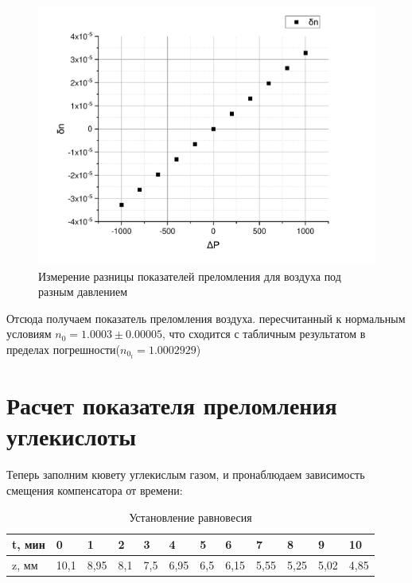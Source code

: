 \documentclass[12pt]{article}
\begin{document}
	\begin{figure}[h!]
		\begin{center}
			\includegraphics[width = \linewidth]{notp}
			\caption{Измерение разницы показателей преломления для воздуха под разным давлением}
		\end{center}
	\end{figure}
	
	Отсюда получаем показатель преломления воздуха. пересчитанный к нормальным условиям $ n_0 = 1.0003\pm 0.00005$, что сходится с табличным результатом в пределах погрешности($n_{0_{t}} = 1.0002929$)
	\newpage
\section{Расчет показателя преломления углекислоты}
	Теперь заполним кювету углекислым газом, и пронаблюдаем зависимость смещения компенсатора от времени:\\
	\begin{table}[h!]
	\caption{Установление равновесия}
\begin{tabular}{|l|l|l|l|l|l|l|l|l|l|l|l|}
\hline
t, мин & 0    & 1    & 2   & 3   & 4    & 5   & 6    & 7    & 8    & 9    & 10   \\ \hline
z, мм  & 10,1 & 8,95 & 8,1 & 7,5 & 6,95 & 6,5 & 6,15 & 5,55 & 5,25 & 5,02 & 4,85 \\ \hline
\end{tabular}
\end{table}
	
\end{document}
